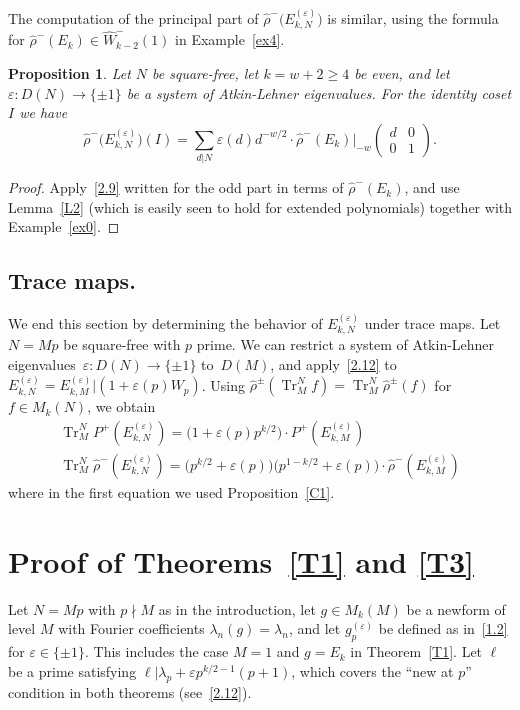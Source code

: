 \documentclass{amsart}
\theoremstyle{plain}
\newtheorem{proposition}[theorem]{Proposition}
\theoremstyle{definition}
\numberwithin{equation}{section}
\def\tr{\operatorname{Tr}}\def\id{\mathrm{Id}}
\def\e{\varepsilon} \def\DD{\Delta} \def\G{\Gamma}\def\om{\omega}
\def\sm#1#2#3#4{\left(\begin{smallmatrix}#1&#2 \\ #3 & #4 \end{smallmatrix}\right)}
\def\be{\begin{equation}}  \def\ee{\end{equation}}
\renewcommand{\wr}{\widehat{\rho}}
\newcommand{\wW}{\widehat{W}}
\def\rar{\rightarrow}\def\FF{\mathbb{F}}
\begin{document}
The computation of the principal part of $\wr^- \big(E_{k,N}^{(\e)}\big)$ is similar, 
using the formula for $\wr^-(E_k)\in \wW_{k-2}^-(1)$ in Example~\ref{ex4}.
\begin{proposition}\label{p2.10}
Let $N$ be square-free, let $k=w+2\ge 4$ be even, and 
let $\e:D(N)\rar\{\pm 1\}$ be a system of Atkin-Lehner eigenvalues. For the 
identity coset $I$ we have 
\[ 
\wr^- \big(E_{k,N}^{(\e)}\big)(I)=\sum_{d|N} \e(d) d^{-w/2}\cdot  
\wr^-(E_k)|_{-w} \sm d001 .
\]
\end{proposition}
\begin{proof} 
Apply~\eqref{2.9} written for the odd part in terms of $\wr^-(E_k)$,  
and use Lemma~\ref{L2} (which is easily seen to hold for extended polynomials) 
together with Example~\ref{ex0}.     
\end{proof}

\subsection{Trace maps.} \label{s2.5}
We end this section by determining the behavior of $E_{k,N}^{(\e)}$ under trace maps. 
Let $N=Mp$ be square-free with $p$ prime.  We can restrict a system of 
Atkin-Lehner eigenvalues~$\e:D(N)\rar\{\pm 1\}$ to~$D(M)$, and  
apply~\eqref{2.12} to $E_{k,N}^{(\e)}= E_{k,M}^{(\e)}|(1+\e(p)W_p)$.
Using $\wr^\pm (\tr^N_M f)=\tr^N_M  \wr^\pm(f)$ for $f\in M_k(N)$, 
we obtain
\be\label{2.10}
\begin{aligned}
\tr^N_M P^+(E_{k,N}^{(\e)})= \big(1+\e(p)p^{k/2}\big)\cdot P^+(E_{k,M}^{(\e)}) \\
\tr^N_M \wr^- (E_{k,N}^{(\e)})= \big(p^{k/2}+\e(p)\big)\big(p^{1-k/2}+\e(p)\big)\cdot
\wr^-(E_{k,M}^{(\e)})
\end{aligned}
\ee
where in the first equation we used Proposition~\ref{C1}.


\section{Proof of Theorems~\ref{T1} and \ref{T3}}
\label{s3}
Let $N=Mp$ with $p\nmid M$ as in the introduction, 
let $g\in M_k(M)$ be a newform of level $M$ with Fourier coefficients $\lambda_n(g)=\lambda_n$, 
and let $g_p^{(\e)}$ be defined as in~\eqref{1.2} for $\e\in \{\pm 1\}$. This includes 
the case $M=1$ and $g=E_k$ in Theorem~\ref{T1}. Let $\ell$ be a prime satisfying 
$\ell|\lambda_p+  \e p^{k/2-1}(p+1)$, which covers the ``new at $p$'' condition in both theorems
(see~\eqref{2.12}). 
\end{document}
